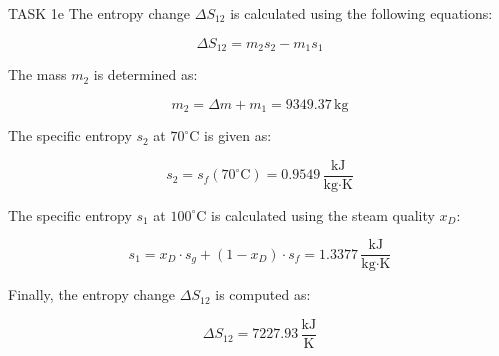 TASK 1e  
The entropy change \( \Delta S_{12} \) is calculated using the following equations:

\[
\Delta S_{12} = m_2 s_2 - m_1 s_1
\]

The mass \( m_2 \) is determined as:

\[
m_2 = \Delta m + m_1 = 9349.37 \, \text{kg}
\]

The specific entropy \( s_2 \) at \( 70^\circ\text{C} \) is given as:

\[
s_2 = s_f(70^\circ\text{C}) = 0.9549 \, \frac{\text{kJ}}{\text{kg·K}}
\]

The specific entropy \( s_1 \) at \( 100^\circ\text{C} \) is calculated using the steam quality \( x_D \):

\[
s_1 = x_D \cdot s_g + (1 - x_D) \cdot s_f = 1.3377 \, \frac{\text{kJ}}{\text{kg·K}}
\]

Finally, the entropy change \( \Delta S_{12} \) is computed as:

\[
\Delta S_{12} = 7227.93 \, \frac{\text{kJ}}{\text{K}}
\]
